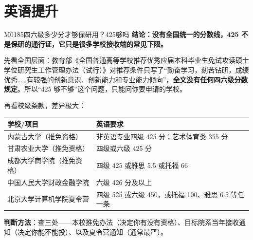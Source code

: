 \section{英语提升}
\begin{qa}{M0185}{四六级多少分才够保研用？425够吗}
\textbf{结论：没有全国统一的分数线，425 不是保研的通行证，它只是很多学校接收端的常见下限。}

先看全国层面：教育部《全国普通高等学校推荐优秀应届本科毕业生免试攻读硕士学位研究生工作管理办法（试行）》对推荐条件只写了“勤奋学习，刻苦钻研，成绩优秀……有较强的创新意识、创新能力和专业能力倾向”，\textbf{全文没有任何四六级分数规定}。所以“425 够不够”这个问题，只能问你要申请的学校。

再看校级条款，差异极大：

\par\vspace{2pt}\nobreak\begin{center}\footnotesize
\begin{tabularx}{\textwidth}{>{\raggedright\arraybackslash}X>{\raggedright\arraybackslash}X}
\toprule
\textbf{学校/项目} & \textbf{英语要求} \\ \midrule
内蒙古大学（推免资格） & 非英语专业四级 425 分；艺术体育类 355 分 \\
甘肃农业大学（推免资格） & 四级或六级 425 分 \\
成都大学商学院（推免资格） & 四级 425 或雅思 5.5 或托福 66 \\
中国人民大学财政金融学院 & 六级 426 分及以上 \\
北京大学计算机学院夏令营 & 四级 525 或六级 450，或托福 100、雅思 6.5 等任一条 \\
\bottomrule
\end{tabularx}
\end{center}\vspace{2pt}\par

\textbf{判断方法}：查三处——本校推免办法（决定你有没有资格）、目标院系当年接收通知（决定你能不能投）、以及夏令营通知（通常最严）。
\end{qa}

